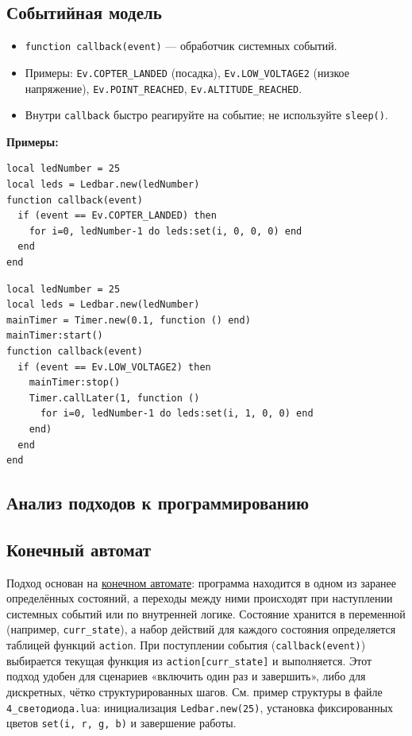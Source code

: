 \subsection{Событийная модель}
\begin{itemize}
  \item \verb|function callback(event)| — обработчик системных событий.
  \item Примеры: \verb|Ev.COPTER_LANDED| (посадка), \verb|Ev.LOW_VOLTAGE2| (низкое напряжение), \verb|Ev.POINT_REACHED|, \verb|Ev.ALTITUDE_REACHED|.
  \item Внутри \verb|callback| быстро реагируйте на событие; не используйте \verb|sleep()|.
\end{itemize}
\textbf{Примеры:}
\begin{verbatim}
local ledNumber = 25
local leds = Ledbar.new(ledNumber)
function callback(event)
  if (event == Ev.COPTER_LANDED) then
    for i=0, ledNumber-1 do leds:set(i, 0, 0, 0) end
  end
end
\end{verbatim}
\begin{verbatim}
local ledNumber = 25
local leds = Ledbar.new(ledNumber)
mainTimer = Timer.new(0.1, function () end)
mainTimer:start()
function callback(event)
  if (event == Ev.LOW_VOLTAGE2) then
    mainTimer:stop()
    Timer.callLater(1, function ()
      for i=0, ledNumber-1 do leds:set(i, 1, 0, 0) end
    end)
  end
end
\end{verbatim}

\subsection{Анализ подходов к программированию}
\subsection{Конечный автомат}
Подход основан на \hyperlink{term:automaton}{конечном автомате}: программа находится в одном из заранее определённых состояний, а переходы между ними происходят при наступлении системных событий или по внутренней логике.
Состояние хранится в переменной (например, \verb|curr_state|), а набор действий для каждого состояния определяется таблицей функций \verb|action|. 
При поступлении события (\verb|callback(event)|) выбирается текущая функция из \verb|action[curr_state]| и выполняется.
Этот подход удобен для сценариев «включить один раз и завершить», либо для дискретных, чётко структурированных шагов. 
См. пример структуры в файле \verb|4_светодиода.lua|: инициализация \verb|Ledbar.new(25)|, установка фиксированных цветов \verb|set(i, r, g, b)| и завершение работы.
